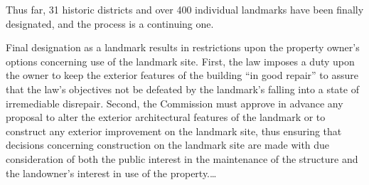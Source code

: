 %
Thus far,
31 historic districts and over 400 individual landmarks have been finally
designated, and the process is a continuing one.

Final designation as a landmark results in restrictions upon the property
owner's options concerning use of the landmark site. First, the law imposes a
duty upon the owner to keep the exterior features of the building ``in good
repair'' to assure that the law's objectives not be defeated by the landmark's
falling into a state of irremediable disrepair. Second, the Commission must
approve in advance any proposal to alter the exterior architectural features of
the landmark or to construct any exterior improvement on the landmark site, thus
ensuring that decisions concerning construction on the landmark site are made
with due consideration of both the public interest in the maintenance of the
structure and the landowner's interest in use of the property.\ldots

